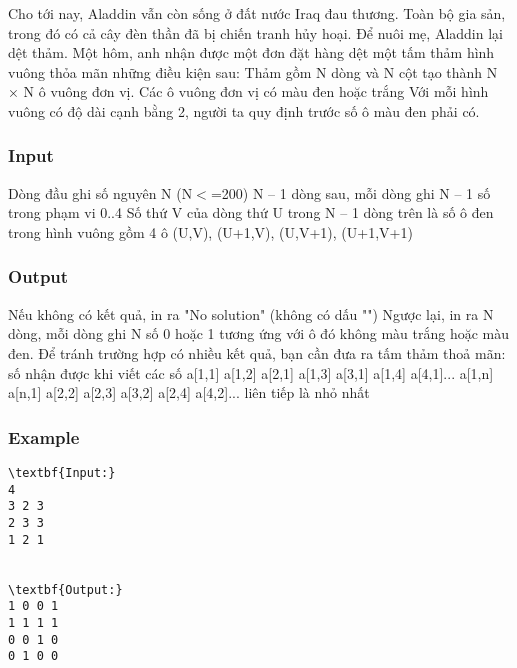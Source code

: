 



   Cho tới nay, Aladdin vẫn còn sống ở đất nước Iraq đau thương. Toàn bộ gia sản, trong đó có cả cây đèn thần đã bị chiến tranh hủy hoại. Để nuôi mẹ, Aladdin lại dệt thảm. Một hôm, anh nhận được một đơn đặt hàng dệt một tấm thảm hình vuông thỏa mãn những điều kiện sau:  Thảm gồm N dòng và N cột tạo thành N × N ô vuông đơn vị. Các ô vuông đơn vị có màu đen hoặc trắng  Với mỗi hình vuông có độ dài cạnh bằng 2, người ta quy định trước số ô màu đen phải có.  

\subsubsection{   Input  }

   Dòng đầu ghi số nguyên N (N$<$=200)  N – 1 dòng sau, mỗi dòng ghi N – 1 số trong phạm vi 0..4  Số thứ V của dòng thứ U trong N – 1 dòng trên là số ô đen trong hình vuông gồm 4 ô (U,V), (U+1,V), (U,V+1), (U+1,V+1)  

\subsubsection{   Output  }

   Nếu không có kết quả, in ra "No solution" (không có dấu "") Ngược lại, in ra N dòng, mỗi dòng ghi N số 0 hoặc 1 tương ứng với ô đó không màu trắng hoặc màu đen. Để tránh trường hợp có nhiều kết quả, bạn cần đưa ra tấm thảm thoả mãn: số nhận được khi viết các số a[1,1] a[1,2] a[2,1] a[1,3] a[3,1] a[1,4] a[4,1]... a[1,n] a[n,1] a[2,2] a[2,3] a[3,2] a[2,4] a[4,2]... liên tiếp là nhỏ nhất  

\subsubsection{   Example  }
\begin{verbatim}
\textbf{Input:}
4
3 2 3
2 3 3
1 2 1


\textbf{Output:}
1 0 0 1
1 1 1 1
0 0 1 0
0 1 0 0
\end{verbatim}